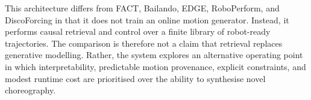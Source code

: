 This architecture differs from FACT, Bailando, EDGE, RoboPerform, and
DiscoForcing in that it does not train an online motion generator. Instead, it
performs causal retrieval and control over a finite library of robot-ready
trajectories. The comparison is therefore not a claim that retrieval replaces
generative modelling. Rather, the system explores an alternative operating
point in which interpretability, predictable motion provenance, explicit
constraints, and modest runtime cost are prioritised over the ability to
synthesise novel choreography.
